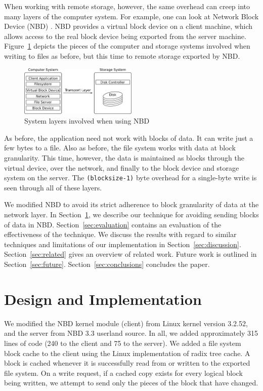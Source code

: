 \documentclass[10pt,twocolumn]{article}
\begin{document}
When working with remote storage, however, the same overhead can creep into many
layers of the computer system. %
For example, one can look at Network Block Device (NBD) \cite{lopez00}. %
NBD provides a virtual block device on a client machine, which allows access to
the real block device being exported from the server machine. %
Figure~\ref{fig:nbd-system} depicts the pieces of the computer and storage
systems involved when writing to files as before, but this time to remote
storage exported by NBD. %

\begin{figure}[htbp]
  \centering
  \includegraphics[width=0.50\textwidth]{figs/nbd-system.png}
  \caption{System layers involved when using NBD}
  \label{fig:nbd-system}
\end{figure}

As before, the application need not work with blocks of data. It can write just
a few bytes to a file. %
Also as before, the file system works with data at block granularity. %
This time, however, the data is maintained as blocks through the virtual device,
over the network, and finally to the block device and storage system on the
server. %
The \mbox{\texttt{(blocksize-1)}} byte overhead for a single-byte write is seen through
all of these layers. %

We modified NBD to avoid its strict adherence to block granularity of data
at the network layer. %
In Section~\ref{sec:design}, we describe our technique for avoiding sending blocks
of data in NBD. %
Section~\ref{sec:evaluation} contains an evaluation of the effectiveness of the
technique. %
We discuss the results with regard to similar techniques and limitations of our
implementation in Section~\ref{sec:discussion}. %
Section~\ref{sec:related} gives an overview of related work. %
Future work is outlined in Section~\ref{sec:future}. %
Section~\ref{sec:conclusions} concludes the paper. %

\section{Design and Implementation}
\label{sec:design}


We modified the NBD kernel module (client) from Linux kernel version 3.2.52,
and the server from NBD 3.3 userland source. %
In all, we added approximately 315 lines of code (240 to the client and 75 to
the server). %
We added a file system block cache to the client using the Linux implementation
of radix tree cache. %
A block is cached whenever it is successfully read from or written to the
exported file system. %
On a write request, if a cached copy exists for every logical block being
written, we attempt to send only the pieces of the block that have changed. %
\end{document}
